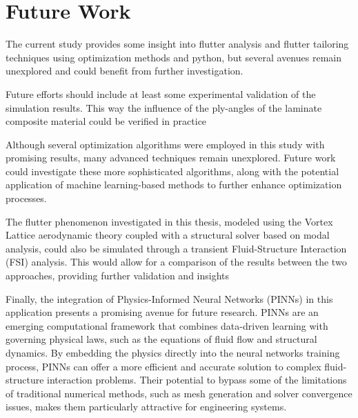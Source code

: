 \section{Future Work}\label{future-work}

The current study provides some insight into flutter analysis and
flutter tailoring techniques using optimization methods and python, but
several avenues remain unexplored and could benefit from further
investigation.

Future efforts should include at least some experimental validation of
the simulation results. This way the influence of the ply-angles of the
laminate composite material could be verified in practice

Although several optimization algorithms were employed in this study
with promising results, many advanced techniques remain unexplored.
Future work could investigate these more sophisticated algorithms, along
with the potential application of machine learning-based methods to
further enhance optimization processes.

The flutter phenomenon investigated in this thesis, modeled using the Vortex
Lattice aerodynamic theory coupled with a structural solver based on
modal analysis, could also be simulated through a transient
Fluid-Structure Interaction (FSI) analysis. This would allow for a
comparison of the results between the two approaches, providing further
validation and insights

Finally, the integration of Physics-Informed Neural Networks (PINNs) in
this application presents a promising avenue for future research. PINNs
are an emerging computational framework that combines data-driven
learning with governing physical laws, such as the equations of fluid
flow and structural dynamics. By embedding the physics directly into the
neural network\textquotesingle s training process, PINNs can offer a
more efficient and accurate solution to complex fluid-structure
interaction problems. Their potential to bypass some of the limitations
of traditional numerical methods, such as mesh generation and solver
convergence issues, makes them particularly attractive for engineering
systems.
